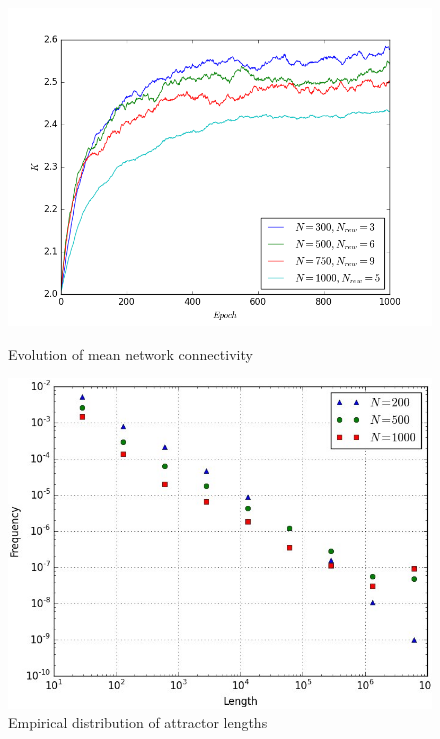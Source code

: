\documentclass[procedia]{easychair}
\begin{document}
	
	\begin{figure}[h]
		\begin{minipage}[t]{0.45\textwidth}
			\includegraphics[width=1.0\textwidth]{plots/evolution}
			\caption{Evolution of mean network connectivity}
			\label{fig:evolution}
		\end{minipage}\hfill
		\begin{minipage}[t]{0.45\textwidth}
			\centering
			\includegraphics[width=1.0\textwidth]{plots/attractors}
			\caption{Empirical distribution of attractor lengths}
			\label{fig:attractors}
		\end{minipage}
	\end{figure}
	\clearpage
\end{document}
